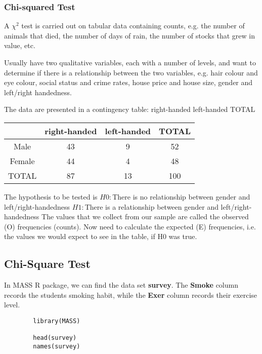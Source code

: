 \documentclass[a4paper,12pt]{article}
\begin{document}

\subsubsection{Chi-squared Test}

A $\chi^2$ test is carried out on tabular data containing counts, e.g. the
number of animals that died, the number of days of rain, the
number of stocks that grew in value, etc.

Usually have two qualitative variables, each with a number of
levels, and want to determine if there is a relationship between the
two variables, e.g. hair colour and eye colour, social status and
crime rates, house price and house size, gender and left/right
handedness.

The data are presented in a contingency table:
right-handed left-handed TOTAL

\begin{tabular}{|c|c|c|c|}
	\hline
	& right-handed &left-handed & TOTAL\\\hline
	Male & 43 & 9 & 52 \\
	Female & 44 & 4 & 48 \\
	TOTAL & 87 & 13 & 100 \\
	\hline
\end{tabular}


The hypothesis to be tested is
$H0 :$There is no relationship between gender and left/right-handedness
$H1 :$There is a relationship between gender and left/right-handedness
The values that we collect from our sample are called the observed
(O) frequencies (counts). Now need to calculate the expected (E)
frequencies, i.e. the values we would expect to see in the table, if
H0 was true.


	
	\subsection{Chi-Square Test}
	
	In MASS R package, we can find the data set \textbf{survey}. The \textbf{Smoke} column records the students smoking habit, while the 
	\textbf{Exer} column records their exercise level. 
	\begin{framed}
		\begin{verbatim}
		library(MASS)
		
		head(survey)
		names(survey)
		\end{verbatim}
	\end{framed}
	
\end{document}
